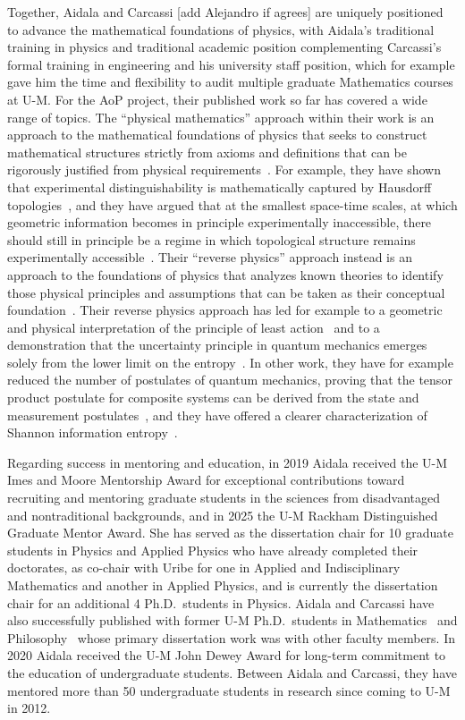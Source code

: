 Together, Aidala and Carcassi [add Alejandro if agrees] are uniquely positioned to advance the mathematical foundations of physics, with Aidala's traditional training in physics and traditional academic position complementing Carcassi's formal training in engineering and his university staff position, which for example gave him the time and flexibility to audit multiple graduate Mathematics courses at U-M.  For the AoP project, their published work so far has covered a wide range of topics.  The ``physical mathematics'' approach within their work is an approach to the mathematical foundations of physics that seeks to construct mathematical structures strictly from axioms and definitions that can be rigorously justified from physical requirements~\cite{aop-book}.  For example, they have shown that experimental distinguishability is mathematically captured by Hausdorff topologies~\cite{aop-book,aop-topExpDisting}, and they have argued that at the smallest space-time scales, at which geometric information becomes in principle experimentally inaccessible, there should still in principle be a regime in which topological structure remains experimentally accessible~\cite{aop-spacetimeStruct}.  Their ``reverse physics'' approach instead is an approach to the foundations of physics that analyzes known theories to identify those physical principles and assumptions that can be taken as their conceptual foundation~\cite{aop-book,Carcassi:2022bpm}. Their reverse physics approach has led for example to a geometric and physical interpretation of the principle of least action~\cite{aop-action} and to a demonstration that the uncertainty principle in quantum mechanics emerges solely from the lower limit on the entropy~\cite{Carcassi:2022bpm}. In other work, they have for example reduced the number of postulates of quantum mechanics, proving that the tensor product postulate for composite systems can be derived from the state and measurement postulates~\cite{Carcassi2021four}, and they have offered a clearer characterization of Shannon information entropy~\cite{Carcassi:2021}. 

Regarding success in mentoring and education, in 2019 Aidala received the U-M Imes and Moore Mentorship Award for exceptional contributions toward recruiting and mentoring graduate students in the sciences from disadvantaged and nontraditional backgrounds, and in 2025 the U-M Rackham Distinguished Graduate Mentor Award.  She has served as the dissertation chair for 10 graduate students in Physics and Applied Physics who have already completed their doctorates, as co-chair with Uribe for one in Applied and Indisciplinary Mathematics and another in Applied Physics, and is currently the dissertation chair for an additional 4 Ph.D.~students in Physics.  Aidala and Carcassi have also successfully published with former U-M Ph.D.~students in Mathematics~\cite{aop-spacetimeStruct} and Philosophy~\cite{aop-HamPriv} whose primary dissertation work was with other faculty members.  In 2020 Aidala received the U-M John Dewey Award for long-term commitment to the education of undergraduate students.  Between Aidala and Carcassi, they have mentored more than 50 undergraduate students in research since coming to U-M in 2012.  \\

